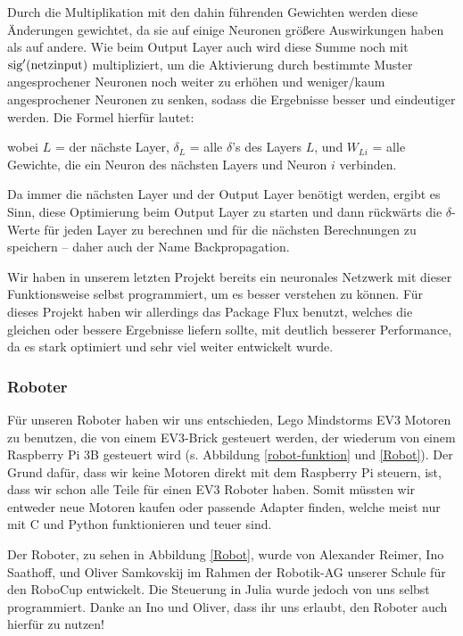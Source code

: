 \documentclass[11pt]{scrartcl}
\begin{document}
	Durch die Multiplikation mit den dahin führenden Gewichten werden diese Änderungen gewichtet, da sie auf einige Neuronen größere Auswirkungen haben als auf andere. Wie beim Output Layer auch wird diese Summe noch mit $\textrm{sig}'(\textrm{netzinput})$ multipliziert, um die Aktivierung durch bestimmte Muster angesprochener Neuronen noch weiter zu erhöhen und weniger/kaum angesprochener Neuronen zu senken, sodass die Ergebnisse besser und eindeutiger werden. Die Formel hierfür lautet:


	\noindent wobei $L$ = der nächste Layer, $\delta_L$ = alle $\delta$'s des Layers $L$, und $W_{Li}$ = alle Gewichte, die ein Neuron des nächsten Layers und Neuron $i$ verbinden.


	Da immer die nächsten Layer und der Output Layer benötigt werden, ergibt es Sinn, diese Optimierung beim Output Layer zu starten und dann rückwärts die \mbox{$\delta$-Werte} für jeden Layer zu berechnen und für die nächsten Berechnungen zu speichern -- daher auch der Name Backpropagation. \cite{MITNeuronale} \cite{3b1b:nn} \cite{brotcrunsher:backwardpass}


	Wir haben in unserem letzten Projekt bereits ein neuronales Netzwerk mit dieser Funktionsweise selbst programmiert, um es besser verstehen zu können. \cite{AIComposer} Für dieses Projekt haben wir allerdings das Package Flux benutzt, welches die gleichen oder bessere Ergebnisse liefern sollte, mit deutlich besserer Performance, da es stark optimiert und sehr viel weiter entwickelt wurde. \cite{Flux.jl-2018}

	\subsubsection{Roboter}

	Für unseren Roboter haben wir uns entschieden, Lego Mindstorms EV3 Motoren zu benutzen, die von einem EV3-Brick gesteuert werden, der wiederum von einem Raspberry Pi 3B gesteuert wird (s. Abbildung \ref{robot-funktion} und \ref{Robot}). Der Grund dafür, dass wir keine Motoren direkt mit dem Raspberry Pi steuern, ist, dass wir schon alle Teile für einen EV3 Roboter haben. Somit müssten wir entweder neue Motoren kaufen oder passende Adapter finden, welche meist nur mit C und Python funktionieren und teuer sind.

	Der Roboter, zu sehen in Abbildung \ref{Robot}, wurde von Alexander Reimer, Ino Saathoff, und Oliver Samkovskij im Rahmen der Robotik-AG unserer Schule für den RoboCup entwickelt. Die Steuerung in Julia wurde jedoch von uns selbst programmiert. Danke an Ino und Oliver, dass ihr uns erlaubt, den Roboter auch hierfür zu nutzen!
\end{document}
